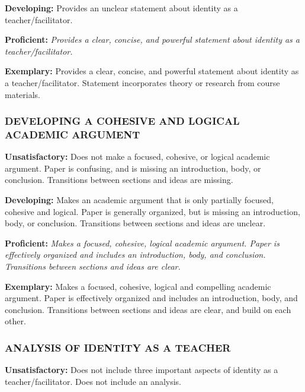 \documentclass[
]{book}
\begin{document}
\textbf{Developing:} Provides an unclear statement about identity as a teacher/facilitator.

\textbf{Proficient:} \emph{Provides a clear, concise, and powerful statement about identity as a teacher/facilitator.}

\textbf{Exemplary:} Provides a clear, concise, and powerful statement about identity as a teacher/facilitator. Statement incorporates theory or research from course materials.

\hypertarget{developing-a-cohesive-and-logical-academic-argument}{%
\subsubsection*{DEVELOPING A COHESIVE AND LOGICAL ACADEMIC ARGUMENT}\label{developing-a-cohesive-and-logical-academic-argument}}

\textbf{Unsatisfactory:} Does not make a focused, cohesive, or logical academic argument. Paper is confusing, and is missing an introduction, body, or conclusion. Transitions between sections and ideas are missing.

\textbf{Developing:} Makes an academic argument that is only partially focused, cohesive and logical. Paper is generally organized, but is missing an introduction, body, or conclusion. Transitions between sections and ideas are unclear.

\textbf{Proficient:} \emph{Makes a focused, cohesive, logical academic argument. Paper is effectively organized and includes an introduction, body, and conclusion. Transitions between sections and ideas are clear.}

\textbf{Exemplary:} Makes a focused, cohesive, logical and compelling academic argument. Paper is effectively organized and includes an introduction, body, and conclusion. Transitions between sections and ideas are clear, and build on each other.

\hypertarget{analysis-of-identity-as-a-teacher}{%
\subsubsection*{ANALYSIS OF IDENTITY AS A TEACHER}\label{analysis-of-identity-as-a-teacher}}

\textbf{Unsatisfactory:} Does not include three important aspects of identity as a teacher/facilitator. Does not include an analysis.
\end{document}
